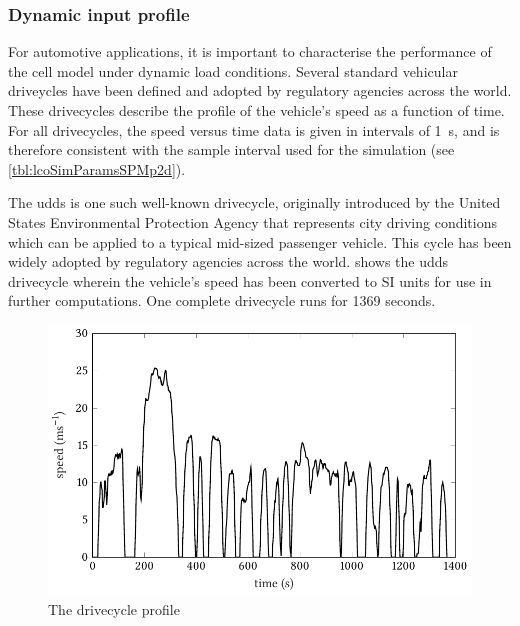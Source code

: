 \subsubsection*{Dynamic input profile}\label{subsubsec:dynamicspmp2dsim}

For automotive applications, it is  important to characterise the performance of
the  cell  model  under  dynamic load  conditions.  Several  standard  vehicular
driveycles  have been  defined and  adopted  by regulatory  agencies across  the
world. These drivecycles
describe  the  profile  of the  vehicle's  speed  as  a  function of  time.  For
all  drivecycles,  the  speed  versus  time   data  is  given  in  intervals  of
\SI{1}{\second}, and is  therefore consistent with the sample  interval used for
the simulation (see \cref{tbl:lcoSimParamsSPMp2d}).

The \gls{udds} is  one such well-known drivecycle, originally  introduced by the
United  States  Environmental Protection  Agency  that  represents city  driving
conditions which can  be applied to a typical mid-sized  passenger vehicle. This
cycle  has  been  widely  adopted  by  regulatory  agencies  across  the  world.
  shows  the  \gls{udds} drivecycle  wherein  the
vehicle's speed has been converted to  SI units for use in further computations.
One complete drivecycle runs for 1369 seconds.

\begin{figure}[!htb]
    \centering
    \includegraphics{4/figures/udds_cycle.pdf}
    \caption{The  drivecycle profile}
    \label{fig:uddsspeedvstimecycle}
\end{figure}

